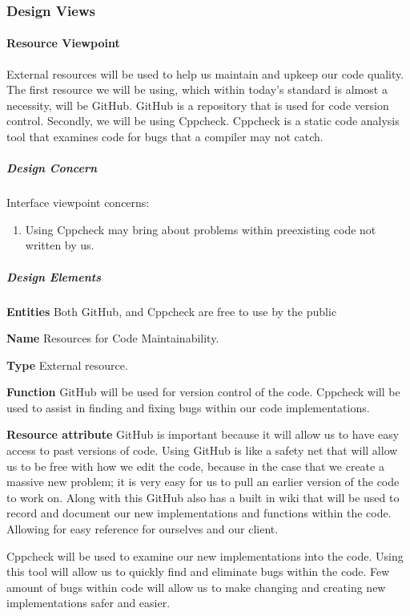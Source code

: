 \begin{flushleft}
\newpage

\subsubsection{Design Views}
\paragraph{Resource Viewpoint}
External resources will be used to help us maintain and upkeep our code quality.
The first resource we will be using, which within today's standard is almost a necessity, will be GitHub.
GitHub is a repository that is used for code version control.
Secondly, we will be using Cppcheck.
Cppcheck is a static code analysis tool that examines code for bugs that a compiler may not catch.

\subparagraph{Design Concern}
Interface viewpoint concerns:
\begin{enumerate}
\item Using Cppcheck may bring about problems within preexisting code not written by us.
\end{enumerate}

\subparagraph{Design Elements}
\textbf{Entities}
Both GitHub, and Cppcheck are free to use by the public

\textbf{Name}
Resources for Code Maintainability.

\textbf{Type}
External resource.

\textbf{Function}
GitHub will be used for version control of the code.
Cppcheck will be used to assist in finding and fixing bugs within our code implementations.

\textbf{Resource attribute}
GitHub is important because it will allow us to have easy access to past versions of code.
Using GitHub is like a safety net that will allow us to be free with how we edit the code, because in the case that we create a massive new problem;
it is very easy for us to pull an earlier version of the code to work on.
Along with this GitHub also has a built in wiki that will be used to record and document our new implementations and functions within the code.
Allowing for easy reference for ourselves and our client.\par
Cppcheck will be used to examine our new implementations into the code.
Using this tool will allow us to quickly find and eliminate bugs within the code.
Few amount of bugs within code will allow us to make changing and creating new implementations safer and easier.


\end{flushleft}
